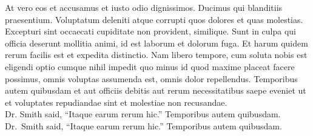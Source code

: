 \documentclass[fleqn]{article}
\begin{document}
\raggedright{
At vero eos et accusamus et iusto odio dignissimos. Ducimus qui
blanditiis praesentium. Voluptatum deleniti atque corrupti quos dolores
et quas molestias. Excepturi sint occaecati cupiditate non provident,
similique. Sunt in culpa qui officia deserunt mollitia animi, id est
laborum et dolorum fuga. Et harum quidem rerum facilis est et expedita
distinctio. Nam libero tempore, cum soluta nobis est eligendi optio
cumque nihil impedit quo minus id quod maxime placeat facere possimus,
omnis voluptas assumenda est, omnis dolor repellendus. Temporibus autem
quibusdam et aut officiis debitis aut rerum necessitatibus saepe eveniet
ut et voluptates repudiandae sint et molestiae non recusandae. \\
Dr. Smith said, ``Itaque earum rerum hic.'' Temporibus autem quibusdam. \\
Dr.~Smith said, ``Itaque earum rerum hic.'' Temporibus autem quibusdam.
}
\end{document}
